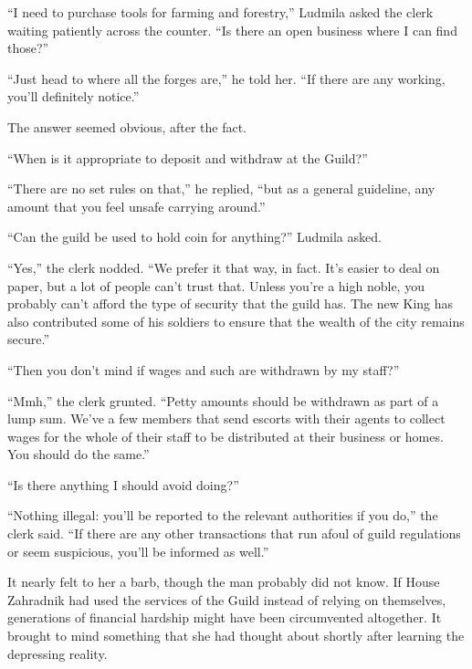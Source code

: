  

“I need to purchase tools for farming and forestry,” Ludmila asked the clerk waiting patiently across the counter. “Is there an open business where I can find those?”

 

“Just head to where all the forges are,” he told her. “If there are any working, you’ll definitely notice.”

 

The answer seemed obvious, after the fact.

 

“When is it appropriate to deposit and withdraw at the Guild?”

 

“There are no set rules on that,” he replied, “but as a general guideline, any amount that you feel unsafe carrying around.”

 

“Can the guild be used to hold coin for anything?” Ludmila asked.

 

“Yes,” the clerk nodded. “We prefer it that way, in fact. It’s easier to deal on paper, but a lot of people can’t trust that. Unless you’re a high noble, you probably can’t afford the type of security that the guild has. The new King has also contributed some of his soldiers to ensure that the wealth of the city remains secure.”

 

“Then you don’t mind if wages and such are withdrawn by my staff?”

 

“Mmh,” the clerk grunted. “Petty amounts should be withdrawn as part of a lump sum. We’ve a few members that send escorts with their agents to collect wages for the whole of their staff to be distributed at their business or homes. You should do the same.”

 

“Is there anything I should avoid doing?”

 

“Nothing illegal: you’ll be reported to the relevant authorities if you do,” the clerk said. “If there are any other transactions that run afoul of guild regulations or seem suspicious, you’ll be informed as well.”

 

It nearly felt to her a barb, though the man probably did not know. If House Zahradnik had used the services of the Guild instead of relying on themselves, generations of financial hardship might have been circumvented altogether. It brought to mind something that she had thought about shortly after learning the depressing reality.

